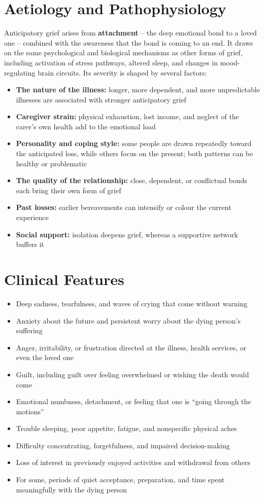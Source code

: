\section*{Aetiology and Pathophysiology}
Anticipatory grief arises from \textbf{attachment} -- the deep emotional bond to a loved one -- combined with the awareness that the bond is coming to an end. It draws on the same psychological and biological mechanisms as other forms of grief, including activation of stress pathways, altered sleep, and changes in mood-regulating brain circuits. Its severity is shaped by several factors:

\begin{itemize}
    \item \textbf{The nature of the illness:} longer, more dependent, and more unpredictable illnesses are associated with stronger anticipatory grief
    \item \textbf{Caregiver strain:} physical exhaustion, lost income, and neglect of the carer's own health add to the emotional load
    \item \textbf{Personality and coping style:} some people are drawn repeatedly toward the anticipated loss, while others focus on the present; both patterns can be healthy or problematic
    \item \textbf{The quality of the relationship:} close, dependent, or conflictual bonds each bring their own form of grief
    \item \textbf{Past losses:} earlier bereavements can intensify or colour the current experience
    \item \textbf{Social support:} isolation deepens grief, whereas a supportive network buffers it
\end{itemize}

\section*{Clinical Features}
\begin{itemize}
    \item Deep sadness, tearfulness, and waves of crying that come without warning
    \item Anxiety about the future and persistent worry about the dying person's suffering
    \item Anger, irritability, or frustration directed at the illness, health services, or even the loved one
    \item Guilt, including guilt over feeling overwhelmed or wishing the death would come
    \item Emotional numbness, detachment, or feeling that one is ``going through the motions''
    \item Trouble sleeping, poor appetite, fatigue, and nonspecific physical aches
    \item Difficulty concentrating, forgetfulness, and impaired decision-making
    \item Loss of interest in previously enjoyed activities and withdrawal from others
    \item For some, periods of quiet acceptance, preparation, and time spent meaningfully with the dying person
\end{itemize}

